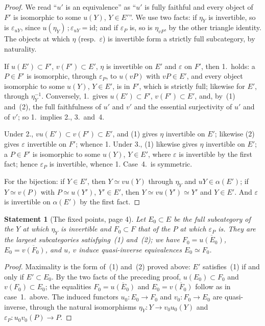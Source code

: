 \documentclass[11pt]{article}
\newcommand{\q}[1]{“#1”}
\theoremstyle{plain}
\newtheorem*{enonce}{Statement}
\theoremstyle{definition}
\theoremstyle{remark}
\begin{document}
\begin{proof}
We read \q{$u'$ is an equivalence} as \q{$u'$ is fully faithful and every object of $F'$ is isomorphic to some $u(Y)$, $Y \in E'$}. We use two facts: if $\eta_Y$ is invertible, so is $\varepsilon_{uY}$, since $u(\eta_Y)\,;\varepsilon_{uY} = \mathrm{id}$; and if $\varepsilon_P$ is, so is $\eta_{vP}$, by the other triangle identity. The objects at which $\eta$ (resp.\ $\varepsilon$) is invertible form a strictly full subcategory, by naturality.

If $u(E') \subset F'$, $v(F') \subset E'$, $\eta$ is invertible on $E'$ and $\varepsilon$ on $F'$, then 1.\ holds: a $P \in F'$ is isomorphic, through $\varepsilon_P$, to $u(vP)$ with $vP \in E'$, and every object isomorphic to some $u(Y)$, $Y \in E'$, is in $F'$, which is strictly full; likewise for $E'$, through $\eta_Y^{-1}$. Conversely, 1.\ gives $u(E') \subset F'$, $v(F') \subset E'$, and, by~(1) and~(2), the full faithfulness of $u'$ and $v'$ and the essential surjectivity of $u'$ and of $v'$; so 1.\ implies 2., 3.\ and~4.

Under 2., $vu(E') \subset v(F') \subset E'$, and (1) gives $\eta$ invertible on $E'$; likewise (2) gives $\varepsilon$ invertible on $F'$; whence 1. Under 3., (1) likewise gives $\eta$ invertible on $E'$; a $P \in F'$ is isomorphic to some $u(Y)$, $Y \in E'$, where $\varepsilon$ is invertible by the first fact; hence $\varepsilon_P$ is invertible, whence 1. Case~4.\ is symmetric.

For the bijection: if $Y \in E'$, then $Y \simeq vu(Y)$ through $\eta_Y$ and $uY \in \alpha(E')$; if $Y \simeq v(P)$ with $P \simeq u(Y')$, $Y' \in E'$, then $Y \simeq vu(Y') \simeq Y'$ and $Y \in E'$. And $\varepsilon$ is invertible on $\alpha(E')$ by the first fact.
\end{proof}

\begin{enonce}[The fixed points, page 4]
Let $E_0 \subset E$ be the full subcategory of the $Y$ at which $\eta_Y$ is invertible and $F_0 \subset F$ that of the $P$ at which $\varepsilon_P$ is. They are the largest subcategories satisfying~(1) and~(2); we have $F_0 = \overline{u(E_0)}$, $E_0 = \overline{v(F_0)}$, and $u$, $v$ induce quasi-inverse equivalences $E_0 \simeq F_0$.
\end{enonce}

\begin{proof}
Maximality is the form of~(1) and~(2) proved above: $E'$ satisfies~(1) if and only if $E' \subset E_0$. By the two facts of the preceding proof, $u(E_0) \subset F_0$ and $v(F_0) \subset E_0$; the equalities $F_0 = \overline{u(E_0)}$ and $E_0 = \overline{v(F_0)}$ follow as in case~1.\ above. The induced functors $u_0 : E_0 \to F_0$ and $v_0 : F_0 \to E_0$ are quasi-inverse, through the natural isomorphisms $\eta_Y : Y \to v_0u_0(Y)$ and $\varepsilon_P : u_0v_0(P) \to P$.
\end{proof}
\end{document}
